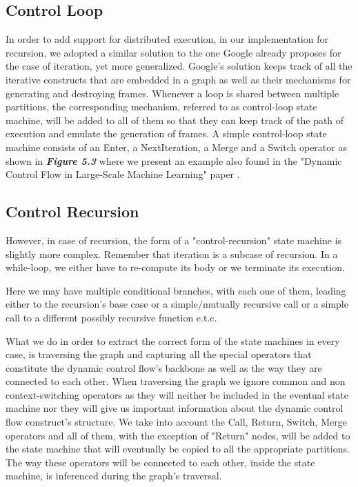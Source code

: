 \documentclass[ack,preface]{dithesis}
\begin{document}
    \subsection{Control Loop}
In order to add support for distributed execution, in our implementation for recursion, we adopted a similar solution to the one Google already proposes for the case of iteration, yet more generalized. Google's solution keeps track of all the iterative constructs that are embedded in a graph as well as their mechanisms for generating and destroying frames. Whenever a loop is shared between multiple partitions, the corresponding mechanism, referred to as control-loop state machine,  will be added to all of them so that they can keep track of the path of execution and emulate the generation of frames.
 A simple control-loop state machine consists of an Enter, a NextIteration, a Merge and a Switch operator as shown in  \textit{\textbf{Figure 5.3}} where we present an example also found in the "Dynamic Control Flow in Large-Scale Machine Learning" paper \cite{Yu:2018}.

    \subsection{Control Recursion}
However, in case of recursion, the form of a "control-recursion" state machine is slightly more complex.  Remember that iteration is a subcase of recursion. In a while-loop, we either have to re-compute its body or we terminate its execution.

Here we may have multiple conditional branches, with each one of them, leading either to the recursion's base case or a simple/mutually recursive call or a simple call to a different possibly recursive function e.t.c. 

What we do in order to extract the correct form of the state machines in every case, is traversing the graph and capturing all the special operators that constitute the dynamic control flow's backbone as well as the way they are connected to each other. When traversing the graph we ignore common and non context-switching operators as they will neither be included in the eventual state machine nor they will give us important information about the dynamic control flow construct's structure. We take into account the Call, Return, Switch, Merge operators and all of them, with the exception of "Return" nodes, will be added to the state machine that will eventually  be copied to all the appropriate partitions. The way these operators will be connected to each other, inside the state machine, is inferenced during the graph's traversal.
\end{document}
